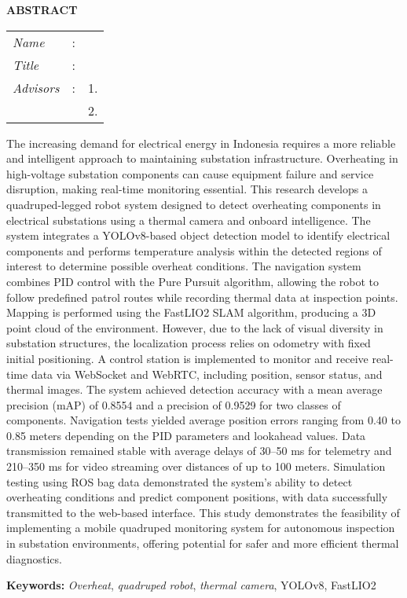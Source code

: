 \begin{center}
  \large\textbf{ABSTRACT}
\end{center}


\vspace{2ex}

\begingroup
\setlength{\tabcolsep}{0pt}
\noindent
\begin{tabularx}{\textwidth}{l >{\centering}m{3em} X}
  \emph{Name}     & : & \name{}         \\
  \emph{Title}    & : & \engtatitle{}   \\
  \emph{Advisors} & : & 1. \advisor{}   \\
                  &   & 2. \coadvisor{} \\
\end{tabularx}
\endgroup

\vspace{2ex}

The increasing demand for electrical energy in Indonesia requires a more reliable and intelligent approach to maintaining substation infrastructure. Overheating in high-voltage substation components can cause equipment failure and service disruption, making real-time monitoring essential. This research develops a quadruped-legged robot system designed to detect overheating components in electrical substations using a thermal camera and onboard intelligence. The system integrates a YOLOv8-based object detection model to identify electrical components and performs temperature analysis within the detected regions of interest to determine possible overheat conditions. The navigation system combines PID control with the Pure Pursuit algorithm, allowing the robot to follow predefined patrol routes while recording thermal data at inspection points. Mapping is performed using the FastLIO2 SLAM algorithm, producing a 3D point cloud of the environment. However, due to the lack of visual diversity in substation structures, the localization process relies on odometry with fixed initial positioning. A control station is implemented to monitor and receive real-time data via WebSocket and WebRTC, including position, sensor status, and thermal images. The system achieved detection accuracy with a mean average precision (mAP) of 0.8554 and a precision of 0.9529 for two classes of components. Navigation tests yielded average position errors ranging from 0.40 to 0.85 meters depending on the PID parameters and lookahead values. Data transmission remained stable with average delays of 30--50 ms for telemetry and 210--350 ms for video streaming over distances of up to 100 meters. Simulation testing using ROS bag data demonstrated the system's ability to detect overheating conditions and predict component positions, with data successfully transmitted to the web-based interface. This study demonstrates the feasibility of implementing a mobile quadruped monitoring system for autonomous inspection in substation environments, offering potential for safer and more efficient thermal diagnostics.

\vspace{2ex}
\noindent
\textbf{Keywords:} \emph{Overheat}, \emph{quadruped robot}, \emph{thermal camera}, YOLOv8, FastLIO2
